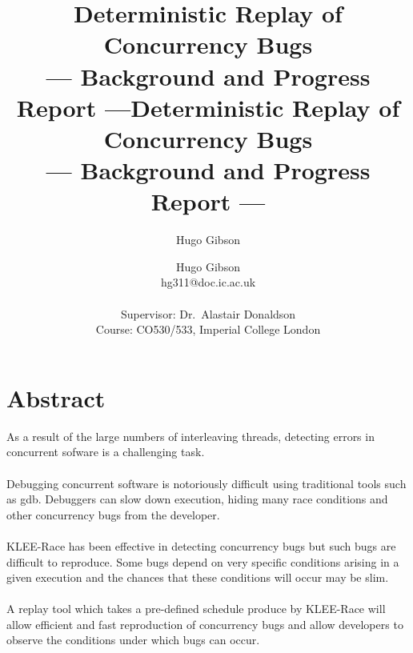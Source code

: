 \documentclass[a4paper,11pt]{article}
\title{Deterministic Replay of Concurrency Bugs\\\Large{--- Background and Progress Report ---}}
\author{Hugo Gibson}
\title{Deterministic Replay of Concurrency Bugs\\\Large{--- Background and Progress Report ---}}
\author{Hugo Gibson\\
       hg311@doc.ic.ac.uk\\ \\
       \small{Supervisor: Dr.\ Alastair Donaldson}\\
       \small{Course: CO530/533, Imperial College London}
}
\begin{document}
\maketitle
\clearpage
\section{Abstract}
As a result of the large numbers of interleaving threads, detecting errors in concurrent sofware is a challenging task.
\\
\\
Debugging concurrent software is notoriously difficult using traditional tools such as gdb. Debuggers can slow down execution, hiding many race conditions and other concurrency bugs from the developer. 
\\
\\
KLEE-Race has been effective in detecting concurrency bugs but such bugs are difficult to reproduce. Some bugs depend on very specific conditions arising in a given execution and the chances that these conditions will occur may be slim.
\\
\\
A replay tool which takes a pre-defined schedule produce by KLEE-Race will allow efficient and fast reproduction of concurrency bugs and allow developers to observe the conditions under which bugs can occur.
\end{document}
